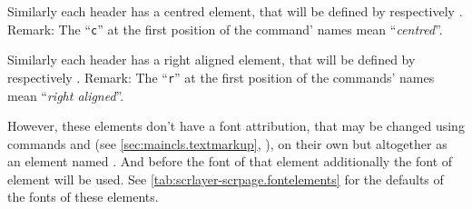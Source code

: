 Similarly each header has a centred element, that will be defined by
 respectively . Remark: The ``\texttt{c}'' at the
first position of the command' names mean ``\emph{centred}''.

Similarly each header has a right aligned element, that will be defined by
 respectively . Remark: The ``\texttt{r}'' at the
first position of the commands' names mean ``\emph{right aligned}''.

%
%
However, these elements don't have a font attribution, that may be changed
using commands  and  (see
\autoref{sec:maincls.textmarkup}, ),
on their own but altogether as an element named . And
before the font of that element additionally the font of element
 will be used. See
\autoref{tab:scrlayer-scrpage.fontelements} for the defaults of the fonts of
these elements.%
%
%

